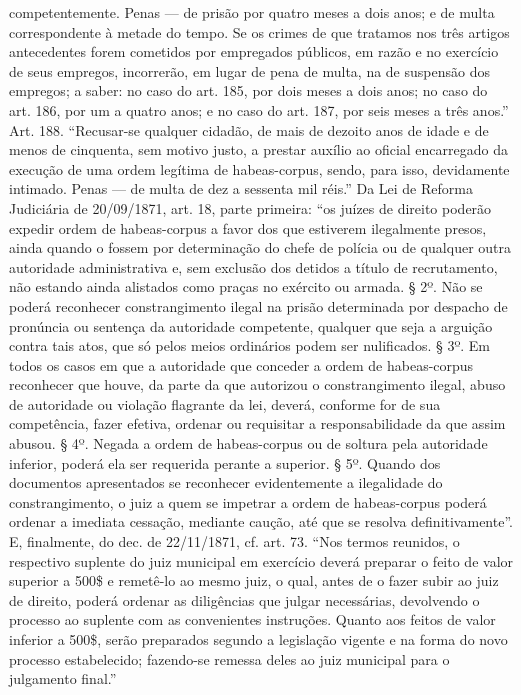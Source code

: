 {{  competentemente. Penas --- de prisão por quatro meses a dois anos; e de
  multa correspondente à metade do tempo. Se os crimes de que tratamos
  nos três artigos antecedentes forem cometidos por empregados
  públicos, em razão e no exercício de seus empregos, incorrerão, em
  lugar de pena de multa, na de suspensão dos empregos; a saber: no caso
  do art. 185, por dois meses a dois anos; no caso do art. 186, por um a
  quatro anos; e no caso do art. 187, por seis meses a três anos.'' Art.
  188. ``Recusar-se qualquer cidadão, de mais de dezoito anos de idade e
  de menos de cinquenta, sem motivo justo, a prestar auxílio ao oficial
  encarregado da execução de uma ordem legítima de habeas-corpus, sendo,
  para isso, devidamente intimado. Penas --- de multa de dez a sessenta
  mil réis.'' Da Lei de Reforma Judiciária de 20/09/1871, art. 18, parte
  primeira: ``os juízes de direito poderão expedir ordem de
  habeas-corpus a favor dos que estiverem ilegalmente presos, ainda
  quando o fossem por determinação do chefe de polícia ou de qualquer
  outra autoridade administrativa e, sem exclusão dos detidos a título
  de recrutamento, não estando ainda alistados como praças no exército
  ou armada. § 2º. Não se poderá reconhecer constrangimento ilegal na
  prisão determinada por despacho de pronúncia ou sentença da autoridade
  competente, qualquer que seja a arguição contra tais atos, que só
  pelos meios ordinários podem ser nulificados. § 3º. Em todos os casos
  em que a autoridade que conceder a ordem de habeas-corpus reconhecer
  que houve, da parte da que autorizou o constrangimento ilegal, abuso
  de autoridade ou violação flagrante da lei, deverá, conforme for de
  sua competência, fazer efetiva, ordenar ou requisitar a
  responsabilidade da que assim abusou. § 4º. Negada a ordem de
  habeas-corpus ou de soltura pela autoridade inferior, poderá ela ser
  requerida perante a superior. § 5º. Quando dos documentos apresentados
  se reconhecer evidentemente a ilegalidade do constrangimento, o juiz a
  quem se impetrar a ordem de habeas-corpus poderá ordenar a imediata
  cessação, mediante caução, até que se resolva definitivamente''. E,
  finalmente, do dec. de 22/11/1871, cf. art. 73. ``Nos termos reunidos,
  o respectivo suplente do juiz municipal em exercício deverá preparar o
  feito de valor superior a 500\$ e remetê-lo ao mesmo juiz, o qual,
  antes de o fazer subir ao juiz de direito, poderá ordenar as
  diligências que julgar necessárias, devolvendo o processo ao suplente
  com as convenientes instruções. Quanto aos feitos de valor inferior a
  500\$, serão preparados segundo a legislação vigente e na forma do
  novo processo estabelecido; fazendo-se remessa deles ao juiz municipal
  para o julgamento final.''}

}
